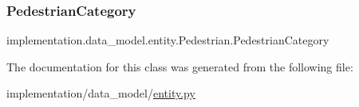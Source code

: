 \subsubsection{\texorpdfstring{Pedestrian\+Category}{PedestrianCategory}}
{\footnotesize\ttfamily implementation.\+data\+\_\+model.\+entity.\+Pedestrian.\+Pedestrian\+Category\hspace{0.3cm}{\ttfamily [static]}}



The documentation for this class was generated from the following file\+:\begin{DoxyCompactItemize}
\item 
implementation/data\+\_\+model/\hyperlink{entity_8py}{entity.\+py}\end{DoxyCompactItemize}
